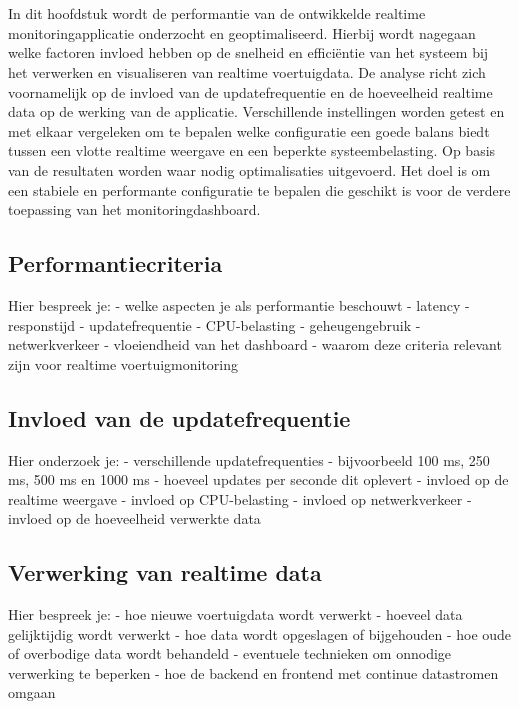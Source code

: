 \chapter{}%
\label{ch:performantieanalyse-en-optimalisatie}
In dit hoofdstuk wordt de performantie van de ontwikkelde realtime monitoringapplicatie onderzocht en geoptimaliseerd. Hierbij wordt nagegaan welke factoren invloed hebben op de snelheid en efficiëntie van het systeem bij het verwerken en visualiseren van realtime voertuigdata.
De analyse richt zich voornamelijk op de invloed van de updatefrequentie en de hoeveelheid realtime data op de werking van de applicatie. Verschillende instellingen worden getest en met elkaar vergeleken om te bepalen welke configuratie een goede balans biedt tussen een vlotte realtime weergave en een beperkte systeembelasting.
Op basis van de resultaten worden waar nodig optimalisaties uitgevoerd. Het doel is om een stabiele en performante configuratie te bepalen die geschikt is voor de verdere toepassing van het monitoringdashboard.

\section{Performantiecriteria}
Hier bespreek je:
- welke aspecten je als performantie beschouwt
- latency
- responstijd
- updatefrequentie
- CPU-belasting
- geheugengebruik
- netwerkverkeer
- vloeiendheid van het dashboard
- waarom deze criteria relevant zijn voor realtime voertuigmonitoring

\section{Invloed van de updatefrequentie}
Hier onderzoek je:
- verschillende updatefrequenties
- bijvoorbeeld 100 ms, 250 ms, 500 ms en 1000 ms
- hoeveel updates per seconde dit oplevert
- invloed op de realtime weergave
- invloed op CPU-belasting
- invloed op netwerkverkeer
- invloed op de hoeveelheid verwerkte data

\section{Verwerking van realtime data}
Hier bespreek je:
- hoe nieuwe voertuigdata wordt verwerkt
- hoeveel data gelijktijdig wordt verwerkt
- hoe data wordt opgeslagen of bijgehouden
- hoe oude of overbodige data wordt behandeld
- eventuele technieken om onnodige verwerking te beperken
- hoe de backend en frontend met continue datastromen omgaan

